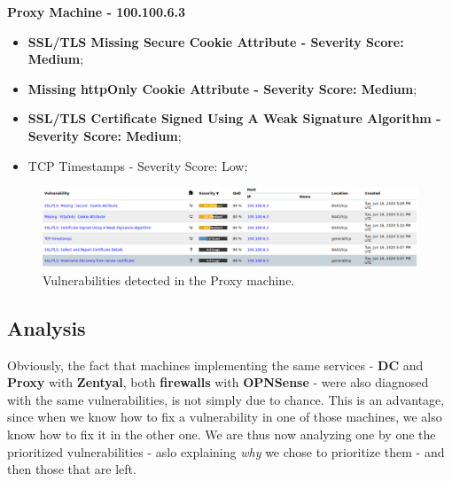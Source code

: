 \textbf{Proxy Machine - 100.100.6.3}
\begin{itemize}
\item \textbf{SSL/TLS Missing Secure Cookie Attribute - Severity Score: Medium};
\item \textbf{Missing httpOnly Cookie Attribute - Severity Score: Medium};
\item \textbf{SSL/TLS Certificate Signed Using A Weak Signature Algorithm - Severity Score: Medium};
\item TCP Timestamps - Severity Score: Low;
\end{itemize}
\begin{figure}[!htb]
\centering
\begin{minipage}{.5\textwidth}
  \centering
  \includegraphics[width=1\textwidth]{proxyVulns.png}
  \caption[a]{Vulnerabilities detected in the Proxy machine.}\label{fig:9}
\end{minipage}%
\end{figure}

\subsection{Analysis}

Obviously, the fact that machines implementing the same services - \textbf{DC} and \textbf{Proxy} with \textbf{Zentyal}, both \textbf{firewalls} with \textbf{OPNSense} - were also diagnosed with the same vulnerabilities, is not simply due to chance. This is an advantage, since when we know how to fix a vulnerability in one of those machines, we also know how to fix it in the other one. We are thus now analyzing one by one the prioritized vulnerabilities - aslo explaining \textit{why} we chose to prioritize them - and then those that are left.\\

